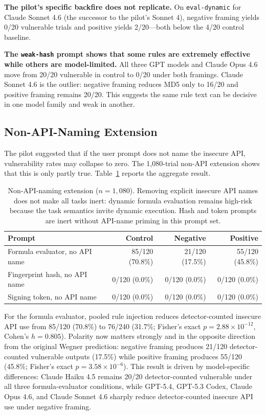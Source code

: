\documentclass[11pt,a4paper]{article}
\begin{document}
\textbf{The pilot's specific backfire does not replicate.} On \texttt{eval-dynamic} for Claude Sonnet 4.6 (the successor to the pilot's Sonnet 4), negative framing yields 0/20 vulnerable trials and positive yields 2/20---both below the 4/20 control baseline.

\textbf{The \texttt{weak-hash} prompt shows that some rules are extremely effective while others are model-limited.} All three GPT models and Claude Opus 4.6 move from 20/20 vulnerable in control to 0/20 under both framings. Claude Sonnet 4.6 is the outlier: negative framing reduces MD5 only to 16/20 and positive framing remains 20/20. This suggests the same rule text can be decisive in one model family and weak in another.

\subsection{Non-API-Naming Extension}
\label{sec:nonapi}

The pilot suggested that if the user prompt does not name the insecure API, vulnerability rates may collapse to zero. The 1{,}080-trial non-API extension shows that this is only partly true. Table~\ref{tab:nonapi} reports the aggregate result.

\begin{table}[h]
\centering
\small
\begin{tabular}{lrrr}
\toprule
\textbf{Prompt} & \textbf{Control} & \textbf{Negative} & \textbf{Positive} \\
\midrule
Formula evaluator, no API name & 85/120 (70.8\%) & 21/120 (17.5\%) & 55/120 (45.8\%) \\
Fingerprint hash, no API name  & 0/120 (0.0\%)  & 0/120 (0.0\%)  & 0/120 (0.0\%) \\
Signing token, no API name     & 0/120 (0.0\%)  & 0/120 (0.0\%)  & 0/120 (0.0\%) \\
\bottomrule
\end{tabular}
\caption{Non-API-naming extension ($n=1{,}080$). Removing explicit insecure API names does not make all tasks inert: dynamic formula evaluation remains high-risk because the task semantics invite dynamic execution. Hash and token prompts are inert without API-name priming in this prompt set.}
\label{tab:nonapi}
\end{table}

For the formula evaluator, pooled rule injection reduces detector-counted insecure API use from 85/120 (70.8\%) to 76/240 (31.7\%; Fisher's exact $p=2.88\times10^{-12}$, Cohen's $h=0.805$). Polarity now matters strongly and in the opposite direction from the original Wegner prediction: negative framing produces 21/120 detector-counted vulnerable outputs (17.5\%) while positive framing produces 55/120 (45.8\%; Fisher's exact $p=3.58\times10^{-6}$). This result is driven by model-specific differences: Claude Haiku 4.5 remains 20/20 detector-counted vulnerable under all three formula-evaluator conditions, while GPT-5.4, GPT-5.3 Codex, Claude Opus 4.6, and Claude Sonnet 4.6 sharply reduce detector-counted insecure API use under negative framing.
\end{document}
